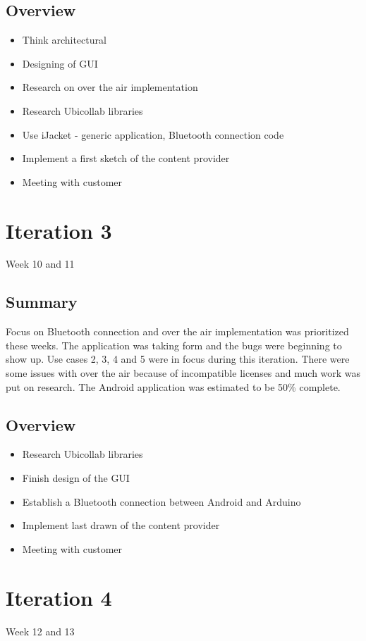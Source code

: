 \subsection{Overview}
\begin{itemize}
	\item{Think architectural}
	\item{Designing of GUI}
	\item{Research on over the air implementation}
	\item{Research Ubicollab libraries}
	\item{Use iJacket - generic application, Bluetooth connection code}
	\item{Implement a first sketch of the content provider}
	\item{Meeting with customer}
\end{itemize}

\section{Iteration 3}
Week 10 and 11
\subsection{Summary}
	Focus on Bluetooth connection and over the air implementation was prioritized these weeks. The application was taking form and the bugs were beginning to show up. Use cases 2, 3, 4 and 5 were in focus during this iteration. There were some issues with over the air because of incompatible licenses and much work was put on research. The Android application was estimated to be 50\% complete.

\subsection{Overview}
\begin{itemize}
	\item{Research Ubicollab libraries}
	\item{Finish design of the GUI}
	\item{Establish a Bluetooth connection between Android and Arduino}
	\item{Implement last drawn of the content provider}
	\item{Meeting with customer}
\end{itemize}

\section{Iteration 4}
Week 12 and 13
